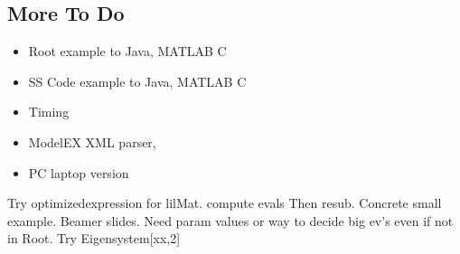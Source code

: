 \documentclass[12pt]{elsart}
\begin{document}
  \subsection{More To Do}
  \begin{itemize}
  \item Root example  to Java, MATLAB C
  \item SS Code example to Java, MATLAB C
  \item Timing
  \item ModelEX XML parser,
  \item PC laptop version
  \end{itemize}





Try optimizedexpression for lilMat.
compute evals Then resub.
Concrete small example.
Beamer slides.
Need param values or way to decide big ev's even if not in  Root.
Try Eigensystem[xx,2]
\end{document}
